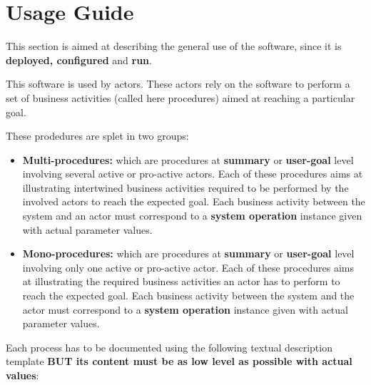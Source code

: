 \chapter{Usage Guide}

\label{chap:usage_guide}



This section is aimed at describing the general use of the software, since it is
\textbf{deployed, configured} and \textbf{run}.

This software is used by actors. These actors rely on the software to perform a
set of business activities (called here procedures) aimed at reaching a
particular goal. 

These prodedures are splet in two groups:
\begin{itemize}
  \item \textbf{Multi-procedures:} which are procedures at \textbf{summary} or
  \textbf{user-goal} level involving several active or pro-active actors.
  Each of these procedures aims at illustrating intertwined
  business activities required to be performed by the involved actors
  to reach the expected goal. Each business activity between the system and an
  actor must correspond to a \textbf{system operation} instance given with actual parameter values.

  \item \textbf{Mono-procedures:} which are procedures at \textbf{summary} or
  \textbf{user-goal} level involving only one active or pro-active actor.
  Each of these procedures aims at illustrating the required business
  activities an actor has to perform to reach the expected goal. Each business
  activity between the system and the actor must correspond to a \textbf{system
  operation} instance given with actual parameter values.

\end{itemize}



Each process has to be documented using the following textual description
template \cite{armour01usecase} \textbf{BUT its content must be as low level as possible with actual values}:

\vspace{0.5cm}

